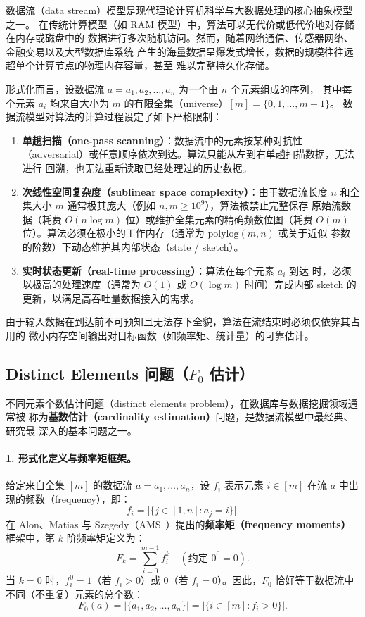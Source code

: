 \documentclass[UTF8, 11pt, a4paper, linestretch=1.15]{ctexart}
\theoremstyle{zhstyle}
\newcommand{\Fzero}{F_0}
\begin{document}
	数据流（data stream）模型是现代理论计算机科学与大数据处理的核心抽象模型之一。
	在传统计算模型（如 RAM 模型）中，算法可以无代价或低代价地对存储在内存或磁盘中的
	数据进行多次随机访问。然而，随着网络通信、传感器网络、金融交易以及大型数据库系统
	产生的海量数据呈爆发式增长，数据的规模往往远超单个计算节点的物理内存容量，甚至
	难以完整持久化存储。
	
	形式化而言，设数据流 $a = a_1, a_2, \dots, a_n$ 为一个由 $n$ 个元素组成的序列，
	其中每个元素 $a_i$ 均来自大小为 $m$ 的有限全集（universe）$[m] = \{0, 1, \dots, m-1\}$。
	数据流模型对算法的计算过程设定了如下严格限制：
	
	\begin{enumerate}
		\item \textbf{单趟扫描（one-pass scanning）}：数据流中的元素按某种对抗性
		（adversarial）或任意顺序依次到达。算法只能从左到右单趟扫描数据，无法进行
		回溯，也无法重新读取已经处理过的历史数据。
		\item \textbf{次线性空间复杂度（sublinear space complexity）}：由于数据流长度
		$n$ 和全集大小 $m$ 通常极其庞大（例如 $n, m \geq 10^9$），算法被禁止完整保存
		原始流数据（耗费 $O(n \log m)$ 位）或维护全集元素的精确频数位图（耗费 $O(m)$
		位）。算法必须在极小的工作内存（通常为 $\mathrm{polylog}(m, n)$ 或关于近似
		参数的阶数）下动态维护其内部状态（state / sketch）。
		\item \textbf{实时状态更新（real-time processing）}：算法在每个元素 $a_i$ 到达
		时，必须以极高的处理速度（通常为 $O(1)$ 或 $O(\log m)$ 时间）完成内部 sketch
		的更新，以满足高吞吐量数据接入的需求。
	\end{enumerate}
	
	由于输入数据在到达前不可预知且无法存下全貌，算法在流结束时必须仅依靠其占用的
	微小内存空间输出对目标函数（如频率矩、统计量）的可靠估计。
	
	\subsection{Distinct Elements 问题（$\Fzero$ 估计）}
	
	不同元素个数估计问题（distinct elements problem），在数据库与数据挖掘领域通常被
	称为\textbf{基数估计（cardinality estimation）}问题，是数据流模型中最经典、研究最
	深入的基本问题之一。
	
	\paragraph{1. 形式化定义与频率矩框架。}
	给定来自全集 $[m]$ 的数据流 $a = a_1, \dots, a_n$，设 $f_i$ 表示元素 $i \in [m]$
	在流 $a$ 中出现的频数（frequency），即：
	\[
	f_i = \big|\{j \in [1, n] : a_j = i\}\big|.
	\]
	在 Alon、Matias 与 Szegedy（AMS~\cite{AMS99}）提出的\textbf{频率矩（frequency
		moments）}框架中，第 $k$ 阶频率矩定义为：
	\[
	F_k = \sum_{i=0}^{m-1} f_i^k \quad (\text{约定 } 0^0 = 0).
	\]
	当 $k = 0$ 时，$f_i^0 = 1$（若 $f_i > 0$）或 $0$（若 $f_i = 0$）。因此，$\Fzero$
	恰好等于数据流中不同（不重复）元素的总个数：
	\[
	\Fzero(a) = |\{a_1, a_2, \dots, a_n\}| = |\{i \in [m] : f_i > 0\}|.
	\]
	
\end{document}
